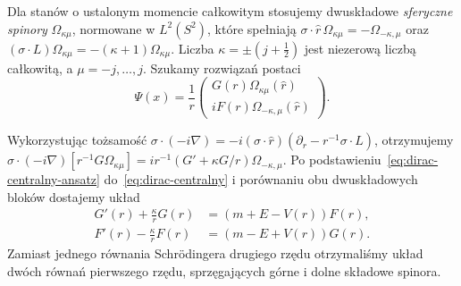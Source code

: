 Dla stanów o ustalonym momencie całkowitym
stosujemy dwuskładowe \emph{sferyczne spinory}
$\Omega_{\kappa\mu}$, normowane w $L^2(S^2)$, które
spełniają
$\sigma\cdot\widehat r\,\Omega_{\kappa\mu}
=-\Omega_{-\kappa,\mu}$ oraz
$(\sigma\cdot L)\Omega_{\kappa\mu}
=-(\kappa+1)\Omega_{\kappa\mu}$.
Liczba $\kappa=\pm(j+\tfrac12)$ jest niezerową
liczbą całkowitą, a $\mu=-j,\ldots,j$.
Szukamy rozwiązań postaci
\begin{equation}\label{eq:dirac-centralny-ansatz}
 \Psi(x)=\frac1r\begin{pmatrix}
 G(r)\Omega_{\kappa\mu}(\widehat r)\\
 iF(r)\Omega_{-\kappa,\mu}(\widehat r)
 \end{pmatrix}.
\end{equation}

Wykorzystując tożsamość
$\sigma\cdot(-i\nabla)
=-i(\sigma\cdot\widehat r)
  (\partial_r-r^{-1}\sigma\cdot L)$,
otrzymujemy
$\sigma\cdot(-i\nabla)
 [r^{-1}G\Omega_{\kappa\mu}]
 =ir^{-1}(G'+\kappa G/r)\Omega_{-\kappa,\mu}$.
Po podstawieniu~\eqref{eq:dirac-centralny-ansatz}
do~\eqref{eq:dirac-centralny} i porównaniu
obu dwuskładowych bloków dostajemy układ
\begin{equation}\label{eq:dirac-rownania-radialne}
 \begin{aligned}
 G'(r)+\frac\kappa rG(r)&=(m+E-V(r))F(r),\\
 F'(r)-\frac\kappa rF(r)&=(m-E+V(r))G(r).
 \end{aligned}
\end{equation}
Zamiast jednego równania Schrödingera drugiego rzędu
otrzymaliśmy układ dwóch równań pierwszego rzędu,
sprzęgających górne i dolne składowe spinora.

